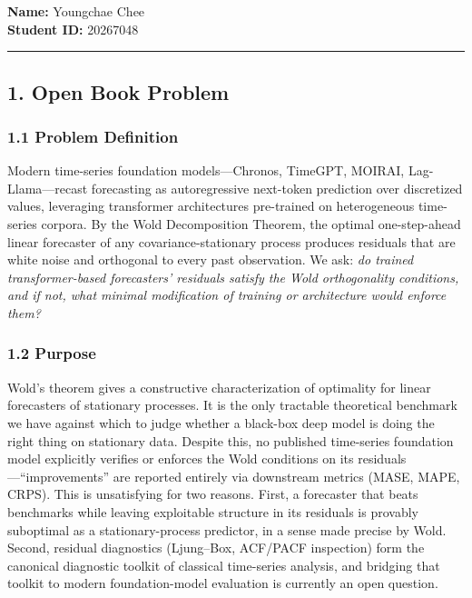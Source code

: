 \documentclass[11pt]{article}
\begin{document}

\textbf{Name:} Youngchae Chee \\
\textbf{Student ID:} 20267048

\noindent\rule{\textwidth}{0.4pt}

\subsection*{1. Open Book Problem}

\vspace{1em}

\subsubsection*{1.1 Problem Definition}
Modern time-series foundation models---Chronos, TimeGPT, MOIRAI, Lag-Llama---recast forecasting as autoregressive next-token prediction over discretized values, leveraging transformer architectures pre-trained on heterogeneous time-series corpora. By the Wold Decomposition Theorem, the optimal one-step-ahead linear forecaster of any covariance-stationary process produces residuals that are white noise and orthogonal to every past observation. We ask: \emph{do trained transformer-based forecasters' residuals satisfy the Wold orthogonality conditions, and if not, what minimal modification of training or architecture would enforce them?}

\subsubsection*{1.2 Purpose}
Wold's theorem gives a constructive characterization of optimality for linear forecasters of stationary processes. It is the only tractable theoretical benchmark we have against which to judge whether a black-box deep model is doing the right thing on stationary data. Despite this, no published time-series foundation model explicitly verifies or enforces the Wold conditions on its residuals---``improvements'' are reported entirely via downstream metrics (MASE, MAPE, CRPS). This is unsatisfying for two reasons. First, a forecaster that beats benchmarks while leaving exploitable structure in its residuals is provably suboptimal as a stationary-process predictor, in a sense made precise by Wold. Second, residual diagnostics (Ljung--Box, ACF/PACF inspection) form the canonical diagnostic toolkit of classical time-series analysis, and bridging that toolkit to modern foundation-model evaluation is currently an open question.
\end{document}
